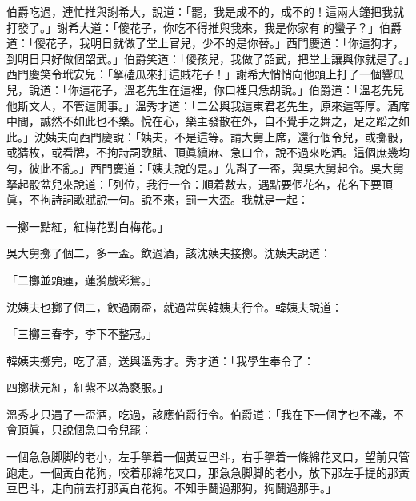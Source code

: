 伯爵吃過，連忙推與謝希大，說道：「罷，我是成不的，成不的！這兩大鐘把我就打發了。」謝希大道：「傻花子，你吃不得推與我來，我是你家有𣬼的蠻子？」伯爵道：「傻花子，我明日就做了堂上官兒，少不的是你替。」西門慶道：「你這狗才，到明日只好做個韶武。」伯爵笑道：「傻孩兒，我做了韶武，把堂上讓與你就是了。」西門慶笑令玳安兒：「拏磕瓜來打這賊花子！」謝希大悄悄向他頭上打了一個響瓜兒，說道：「你這花子，溫老先生在這裡，你口裡只恁胡說。」伯爵道：「溫老先兒他斯文人，不管這閒事。」溫秀才道：「二公與我這東君老先生，原來這等厚。酒席中間，誠然不如此也不樂。悅在心，樂主發散在外，自不覺手之舞之，足之蹈之如此。」{}沈姨夫向西門慶說：「姨夫，不是這等。請大舅上席，還行個令兒，或擲骰，或猜枚，或看牌，不拘詩詞歌賦、頂眞續麻、急口令，說不過來吃酒。這個庶幾均勻，彼此不亂。」西門慶道：「姨夫說的是。」先斟了一盃，與吳大舅起令。吳大舅拏起骰盆兒來說道：「列位，我行一令：順着數去，遇點要個花名，花名下要頂眞，不拘詩詞歌賦說一句。說不來，罰一大盃。我就是一起：

\begin{myquote}
一擲一點紅，紅梅花對白梅花。」
\end{myquote}

吳大舅擲了個二，多一盃。飲過酒，該沈姨夫接擲。沈姨夫說道：

\begin{myquote}
「二擲並頭蓮，蓮漪戲彩鴛。」
\end{myquote}

沈姨夫也擲了個二，飲過兩盃，就過盆與韓姨夫行令。韓姨夫說道：

\begin{myquote}
「三擲三春李，李下不整冠。」
\end{myquote}

韓姨夫擲完，吃了酒，送與溫秀才。秀才道：「我學生奉令了：

\begin{myquote}
四擲狀元紅，紅紫不以為褻服。」{}
\end{myquote}

溫秀才只遇了一盃酒，吃過，該應伯爵行令。伯爵道：「我在下一個字也不識，不會頂眞，只說個急口令兒罷：

\begin{myquote}
一個急急脚脚的老小，左手拏着一個黃豆巴斗，右手拏着一條綿花叉口，望前只管跑走。一個黃白花狗，咬着那綿花叉口，那急急脚脚的老小，放下那左手提的那黃豆巴斗，走向前去打那黃白花狗。不知手鬪過那狗，狗鬪過那手。」
\end{myquote}

